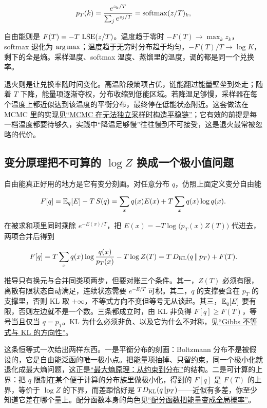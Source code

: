 \[
p_T(k)=\frac{e^{z_k/T}}{\sum_{j}e^{z_j/T}}=\operatorname{softmax}(z/T)_k,
\]

自由能则是 \(F(T)=-T\,\operatorname{LSE}(z/T)\)。温度趋于零时 \(-F(T)\to\max_k z_k\)，softmax 退化为 \(\operatorname*{arg\,max}\)；温度趋于无穷时分布趋于均匀，\(-F(T)/T\to\log K\)，剩下的全是熵。采样温度、softmax 温度、蒸馏里的温度，调的都是同一个兑换率。

退火则是让兑换率随时间变化。高温阶段熵项占优，链能翻过能量壁垒到处走；随着 \(T\) 下降，能量项逐渐夺权，分布收缩到低能区域。若降温足够慢，采样器在每个温度上都近似达到该温度的平衡分布，最终停在低能状态附近。这套做法在 MCMC 里的实现见\hyperref[sec:13-Machine-Learning/08-Sampling-and-Inference/02]{``MCMC 在无法独立采样时构造平稳链''}；它有效的前提是每一档温度都要待够久，实践中``降温足够慢''往往慢到不可接受，这是退火最常被忽略的代价。

\subsection{变分原理把不可算的 \(\log Z\) 换成一个极小值问题}

自由能真正好用的地方是它有变分刻画。对任意分布 \(q\)，仿照上面定义变分自由能

\[
F[q]=\mathbb{E}_q[E]-T\,S(q)=\sum_x q(x)E(x)+T\sum_x q(x)\log q(x).
\]

在被求和项里同时乘除 \(e^{-E(x)/T}\)，把 \(E(x)=-T\log\bigl(p_T(x)Z(T)\bigr)\) 代进去，两项合并后得到

\[
F[q]=T\sum_x q(x)\log\frac{q(x)}{p_T(x)}-T\log Z(T)
=T\,D_{\mathrm{KL}}(q\,\|\,p_T)+F(T).
\]

推导只有换元与合并同类项两步，但要对账三个条件。其一，\(Z(T)\) 必须有限，离散有限状态自动满足，连续状态需要 \(e^{-E/T}\) 可积。其二，\(q\) 的支撑要含在 \(p_T\) 的支撑里，否则 KL 取 \(+\infty\)，不等式方向不变但等号无从谈起。其三，\(\mathbb{E}_q[E]\) 要有限，否则左边就不是一个数。三条都成立时，由 KL 非负得 \(F[q]\ge F(T)\)，等号当且仅当 \(q=p_T\)。KL 为什么必须非负、以及它为什么不对称，见\hyperref[sec:07-Information-Theory/03-Divergences/02]{``Gibbs 不等式与 KL 的方向性''}。

这条恒等式一次给出两样东西。一是平衡分布的刻画：Boltzmann 分布不是被假设的，它是自由能泛函的唯一极小点。把能量项抽掉、只留约束，同一个极小化就退化成最大熵问题，这正是\hyperref[sec:07-Information-Theory/01-Information-and-Entropy/04]{``最大熵原理：从约束到分布''}的结构。二是可计算的上界：把 \(q\) 限制在某个便于计算的分布族里做极小化，得到的 \(F[q]\) 是 \(F(T)\) 的上界，等价于 \(\log Z\) 的下界，而差距恰好是 \(TD_{\mathrm{KL}}(q\|p_T)\)——近似有多差，你至少知道它差在哪个量上。配分函数本身的角色见\hyperref[sec:13-Machine-Learning/08-Sampling-and-Inference/06]{``配分函数把能量变成全局概率''}。

